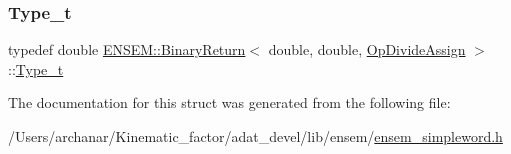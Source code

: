 \mbox{\label{structENSEM_1_1BinaryReturn_3_01double_00_01double_00_01OpDivideAssign_01_4_aa4a7939a8bbedada7f3b6703da6902f7}} 
\subsubsection{\texorpdfstring{Type\_t}{Type\_t}\hspace{0.1cm}{\footnotesize\ttfamily [2/2]}}
{\footnotesize\ttfamily typedef double \mbox{\hyperlink{structENSEM_1_1BinaryReturn}{E\+N\+S\+E\+M\+::\+Binary\+Return}}$<$ double, double, \mbox{\hyperlink{structENSEM_1_1OpDivideAssign}{Op\+Divide\+Assign}} $>$\+::\mbox{\hyperlink{structENSEM_1_1BinaryReturn_3_01double_00_01double_00_01OpDivideAssign_01_4_aa4a7939a8bbedada7f3b6703da6902f7}{Type\+\_\+t}}}



The documentation for this struct was generated from the following file\+:\begin{DoxyCompactItemize}
\item 
/\+Users/archanar/\+Kinematic\+\_\+factor/adat\+\_\+devel/lib/ensem/\mbox{\hyperlink{lib_2ensem_2ensem__simpleword_8h}{ensem\+\_\+simpleword.\+h}}\end{DoxyCompactItemize}
